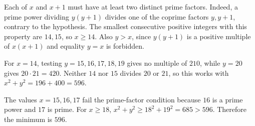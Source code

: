 Each of $x$ and $x+1$ must have at least two distinct prime factors. Indeed, a prime power dividing $y(y+1)$ divides one of the coprime factors $y,y+1$, contrary to the hypothesis. The smallest consecutive positive integers with this property are $14,15$, so $x\ge14$. Also $y>x$, since $y(y+1)$ is a positive multiple of $x(x+1)$ and equality $y=x$ is forbidden.

For $x=14$, testing $y=15,16,17,18,19$ gives no multiple of $210$, while $y=20$ gives $20\cdot21=420$. Neither $14$ nor $15$ divides $20$ or $21$, so this works with $x^2+y^2=196+400=596$.

The values $x=15,16,17$ fail the prime-factor condition because $16$ is a prime power and $17$ is prime. For $x\ge18$, $x^2+y^2\ge18^2+19^2=685>596$. Therefore the minimum is $\boxed{596}$.
